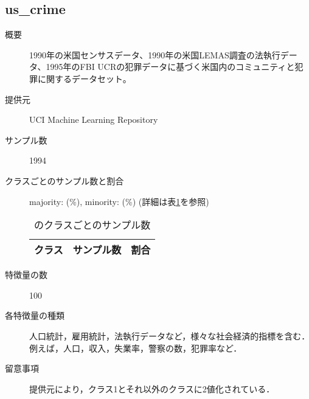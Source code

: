 \subsection{us\_crime}
\begin{description}
    \item[概要] 1990年の米国センサスデータ、1990年の米国LEMAS調査の法執行データ、1995年のFBI UCRの犯罪データに基づく米国内のコミュニティと犯罪に関するデータセット。\cite{us_crime}
    \item[提供元] UCI Machine Learning Repository
    \item[サンプル数] 1994
    \item[クラスごとのサンプル数と割合] majority:  (\%), minority:  (\%) (詳細は表\ref{tab:}を参照)

        \begin{table}[htbp]
            \centering
            \caption{のクラスごとのサンプル数}
            \label{tab:}
            \begin{tabular}{lrc} \hline
                \multicolumn{1}{c}{クラス}&
                \multicolumn{1}{c}{サンプル数}&
                \multicolumn{1}{c}{割合}\\
                \hline
                \hline

                \hline
            \end{tabular}
        \end{table}

    \item[特徴量の数] 100
    \item[各特徴量の種類] \mbox{}
        人口統計，雇用統計，法執行データなど，様々な社会経済的指標を含む．例えば，人口，収入，失業率，警察の数，犯罪率など．
    \item[留意事項] 提供元により，クラス1とそれ以外のクラスに2値化されている．
\end{description}

